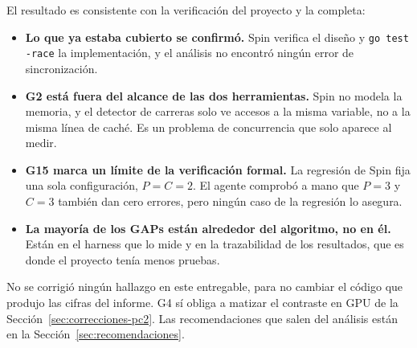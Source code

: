 El resultado es consistente con la verificación del proyecto y la completa:
\begin{itemize}
  \item \textbf{Lo que ya estaba cubierto se confirmó.} Spin verifica el diseño y
        \texttt{go test -race} la implementación, y el análisis no encontró ningún error de
        sincronización.
  \item \textbf{G2 está fuera del alcance de las dos herramientas.} Spin no modela la memoria, y el
        detector de carreras solo ve accesos a la misma variable, no a la misma línea de caché. Es
        un problema de concurrencia que solo aparece al medir.
  \item \textbf{G15 marca un límite de la verificación formal.} La regresión de Spin fija una sola
        configuración, $P = C = 2$. El agente comprobó a mano que $P=3$ y $C=3$ también dan cero
        errores, pero ningún caso de la regresión lo asegura.
  \item \textbf{La mayoría de los GAPs están alrededor del algoritmo, no en él.} Están en el
        harness que lo mide y en la trazabilidad de los resultados, que es donde el proyecto tenía
        menos pruebas.
\end{itemize}

No se corrigió ningún hallazgo en este entregable, para no cambiar el código que produjo las cifras
del informe. G4 sí obliga a matizar el contraste en GPU de la Sección~\ref{sec:correcciones-pc2}.
Las recomendaciones que salen del análisis están en la Sección~\ref{sec:recomendaciones}.
